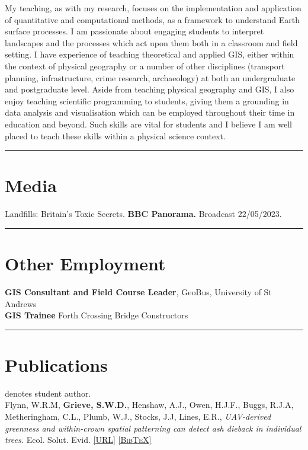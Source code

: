 \documentclass[10pt, a4paper]{article}
\newcommand{\doi}[1]{\href{https://dx.doi.org/#1}{\scriptsize\textsc{[URL]}}}
\newcommand{\bib}[1]{\href{https://www.doi2bib.org/bib/#1}{\scriptsize\textsc{[BibTeX]}}}
\newcommand{\paperlinks}[1]{\doi{#1} \bib{#1}}
\newcommand{\student}{\textbf{\textsuperscript{\textdagger}}}
\newcommand{\years}[1]{\marginnote{\scriptsize #1}}
\begin{document}
  My teaching, as with my research, focuses on the implementation and application of quantitative and computational methods, as a framework to understand Earth surface processes. I am passionate about engaging students to interpret landscapes and the processes which act upon them both in a classroom and field setting. I have experience of teaching theoretical and applied GIS, either within the context of physical geography or a number of other disciplines (transport planning, infrastructure, crime research, archaeology) at both an undergraduate and postgraduate level. Aside from teaching physical geography and GIS, I also enjoy teaching scientific programming to students, giving them a grounding in data analysis and visualisation which can be employed throughout their time in education and beyond. Such skills are vital for students and I believe I am well placed to teach these skills within a physical science context.\\[0.05cm]

\fi

\hrule
\section*{Media}
\noindent

\years{2023}Landfills: Britain's Toxic Secrets. \textbf{BBC Panorama.} Broadcast 22/05/2023.\\[0.05cm]

\hrule
\section*{Other Employment}
\noindent

\years{2015--2016} \textbf{GIS Consultant and Field Course Leader}, GeoBus, University of St Andrews\\[0.05cm]
\years{2012--2013} \textbf{GIS Trainee} Forth Crossing Bridge Constructors\\[0.05cm]

\hrule
\section*{Publications}
\noindent
\student denotes student author.\\[0.05cm]

\years{2024}Flynn, W.R.M\student, \textbf{Grieve, S.W.D.}, Henshaw, A.J., Owen, H.J.F., Buggs, R.J.A, Metheringham, C.L., Plumb, W.J., Stocks, J.J, Lines, E.R., \textit{UAV-derived greenness and within-crown spatial patterning can detect ash dieback in individual trees.} Ecol. Solut. Evid. \paperlinks{10.1002/2688-8319.12343} \\[0.05cm]
\end{document}
